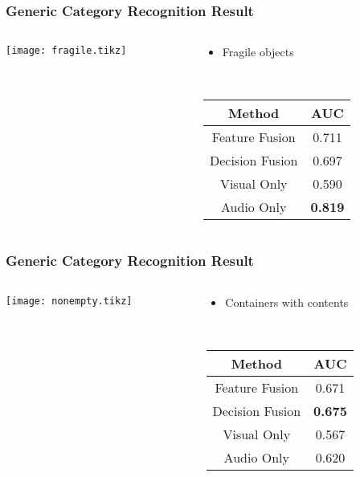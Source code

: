 \documentclass{beamer}
\begin{document}
  \begin{frame}
    \frametitle{Generic Category Recognition Result}

    \begin{columns}
      \begin{column}{.6\textwidth}
        \centering
        \footnotesize
        \texttt{[image: fragile.tikz]}
      \end{column}
      \begin{column}{.4\textwidth}
        \begin{itemize}
          \item Fragile objects
        \end{itemize}
        ~

        \footnotesize
        \begin{tabular}[h]{c|c}
          \hline
          Method & AUC \\ \hline \hline
          Feature Fusion & 0.711 \\ \hline
          Decision Fusion  & 0.697 \\ \hline
          Visual Only & 0.590 \\ \hline
          Audio Only & \textbf{0.819} \\ \hline
        \end{tabular}
      \end{column}
    \end{columns}
  \end{frame}
  \begin{frame}
    \frametitle{Generic Category Recognition Result}

    \begin{columns}
      \begin{column}{.6\textwidth}
        \centering
        \footnotesize
        \texttt{[image: nonempty.tikz]}
      \end{column}
      \begin{column}{.4\textwidth}
        \begin{itemize}
          \item Containers with contents
        \end{itemize}
        ~

        \footnotesize
        \begin{tabular}[h]{c|c}
          \hline
          Method & AUC \\ \hline \hline
          Feature Fusion & 0.671 \\ \hline
          Decision Fusion  & \textbf{0.675} \\ \hline
          Visual Only & 0.567 \\ \hline
          Audio Only & 0.620 \\ \hline
        \end{tabular}
      \end{column}
    \end{columns}
  \end{frame}
\end{document}
